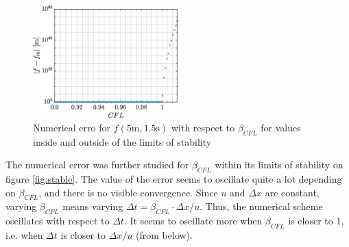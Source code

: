 \documentclass[a4paper,12pt,twoside]{article}
\begin{document}
    \begin{figure}[h]
     \centering
     \includegraphics[width=0.5\textwidth]{graphs/convCFL.eps}
     \caption{Numerical erro for $f(5\text{m},1.5\text{s})$ with respect to $\beta_{CFL}$ for values inside and outside of the limits of stability}
     \label{fig:unstable}
    \end{figure}

    The numerical error was further studied for $\beta_{CFL}$ within its limits of stability on figure \ref{fig:stable}. The value of the error seems to oscillate quite a lot depending on $\beta_{CFL}$, and there is no visible convergence. Since $u$ and $\Delta x$ are constant, varying $\beta_{CFL}$ means varying $\Delta t=\beta_{CFL}\cdot \Delta x/u$. Thus, the numerical scheme oscillates with respect to $\Delta t$. It seems to oscillate more when $\beta_{CFL}$ is closer to 1, i.e. when $\Delta t$ is closer to $\Delta x/ u$ (from below).
\end{document}
